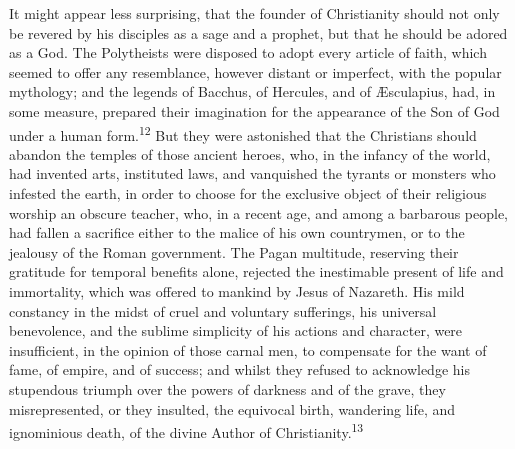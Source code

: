 


It might appear less surprising, that the founder of Christianity
should not only be revered by his disciples as a sage and a
prophet, but that he should be adored as a God. The Polytheists
were disposed to adopt every article of faith, which seemed to
offer any resemblance, however distant or imperfect, with the
popular mythology; and the legends of Bacchus, of Hercules, and
of Æsculapius, had, in some measure, prepared their imagination
for the appearance of the Son of God under a human form.\textsuperscript{12} But
they were astonished that the Christians should abandon the
temples of those ancient heroes, who, in the infancy of the
world, had invented arts, instituted laws, and vanquished the
tyrants or monsters who infested the earth, in order to choose
for the exclusive object of their religious worship an obscure
teacher, who, in a recent age, and among a barbarous people, had
fallen a sacrifice either to the malice of his own countrymen, or
to the jealousy of the Roman government. The Pagan multitude,
reserving their gratitude for temporal benefits alone, rejected
the inestimable present of life and immortality, which was
offered to mankind by Jesus of Nazareth. His mild constancy in
the midst of cruel and voluntary sufferings, his universal
benevolence, and the sublime simplicity of his actions and
character, were insufficient, in the opinion of those carnal men,
to compensate for the want of fame, of empire, and of success;
and whilst they refused to acknowledge his stupendous triumph
over the powers of darkness and of the grave, they
misrepresented, or they insulted, the equivocal birth, wandering
life, and ignominious death, of the divine Author of
Christianity.\textsuperscript{13}

